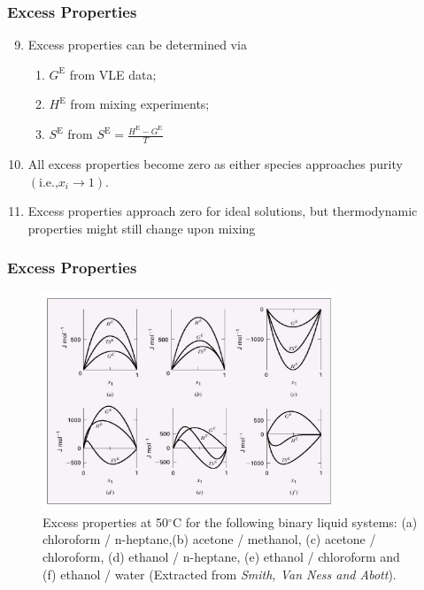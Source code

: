\documentclass[10pt,compress,handout,ignorenonframetext]{beamer}
\newcommand{\frc}{\displaystyle\frac}
\begin{document}
\begin{frame}
  \frametitle{Excess Properties}
  \begin{enumerate}\setcounter{enumi}{8}
      \item<1-> Excess properties can be determined via
         \begin{enumerate}
            \item<1-> $G^{\text{E}}$ from VLE data;
            \item<1-> $H^{\text{E}}$ from mixing experiments;
            \item<1-> $S^{\text{E}}$ from $S^{\text{E}}=\frc{H^{\text{E}}-G^{\text{E}}}{T}$
         \end{enumerate}
      \item<2-> All excess properties become zero as either species approaches purity $\left(\text{i.e.,} x_{i}\rightarrow 1\right)$.
      \item<3-> Excess properties approach zero for ideal solutions, but thermodynamic properties might still change upon mixing
  \end{enumerate}
\end{frame}
\normalsize

\scriptsize
\begin{frame}
  \frametitle{Excess Properties}
     \begin{center}
       \begin{figure}
         \includegraphics[width=9.cm, height=6.5cm,clip]{./Pics/ExcessProperties_Plot}
          \caption{\scriptsize Excess properties at 50$^{\circ}$C for the following binary liquid systems: (a) chloroform / n-heptane,(b) acetone / methanol, (c) acetone / chloroform, (d) ethanol / n-heptane, (e) ethanol / chloroform and (f) ethanol / water (Extracted from {\it Smith, Van Ness and Abott}). }
       \end{figure}
     \end{center}
\end{frame}
\normalsize
\end{document}
